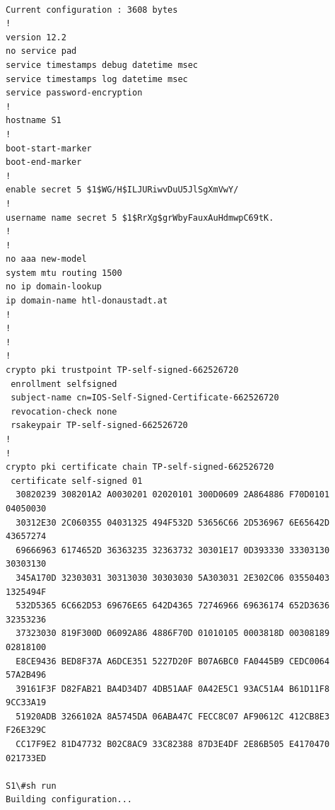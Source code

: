 \documentclass[a4paper]{article}
\begin{document}
\begin{lstlisting}
	
Current configuration : 3608 bytes
!
version 12.2
no service pad
service timestamps debug datetime msec
service timestamps log datetime msec
service password-encryption
!
hostname S1
!
boot-start-marker
boot-end-marker
!
enable secret 5 $1$WG/H$ILJURiwvDuU5JlSgXmVwY/
!
username name secret 5 $1$RrXg$grWbyFauxAuHdmwpC69tK.
!
!
no aaa new-model
system mtu routing 1500
no ip domain-lookup
ip domain-name htl-donaustadt.at
!
!
!
!
crypto pki trustpoint TP-self-signed-662526720
 enrollment selfsigned
 subject-name cn=IOS-Self-Signed-Certificate-662526720
 revocation-check none
 rsakeypair TP-self-signed-662526720
!
!
crypto pki certificate chain TP-self-signed-662526720
 certificate self-signed 01
  30820239 308201A2 A0030201 02020101 300D0609 2A864886 F70D0101 04050030
  30312E30 2C060355 04031325 494F532D 53656C66 2D536967 6E65642D 43657274
  69666963 6174652D 36363235 32363732 30301E17 0D393330 33303130 30303130
  345A170D 32303031 30313030 30303030 5A303031 2E302C06 03550403 1325494F
  532D5365 6C662D53 69676E65 642D4365 72746966 69636174 652D3636 32353236
  37323030 819F300D 06092A86 4886F70D 01010105 0003818D 00308189 02818100
  E8CE9436 BED8F37A A6DCE351 5227D20F B07A6BC0 FA0445B9 CEDC0064 57A2B496
  39161F3F D82FAB21 BA4D34D7 4DB51AAF 0A42E5C1 93AC51A4 B61D11F8 9CC33A19
  51920ADB 3266102A 8A5745DA 06ABA47C FECC8C07 AF90612C 412CB8E3 F26E329C
  CC17F9E2 81D47732 B02C8AC9 33C82388 87D3E4DF 2E86B505 E4170470 021733ED

S1\#sh run
Building configuration...


\end{lstlisting}
\end{document}
